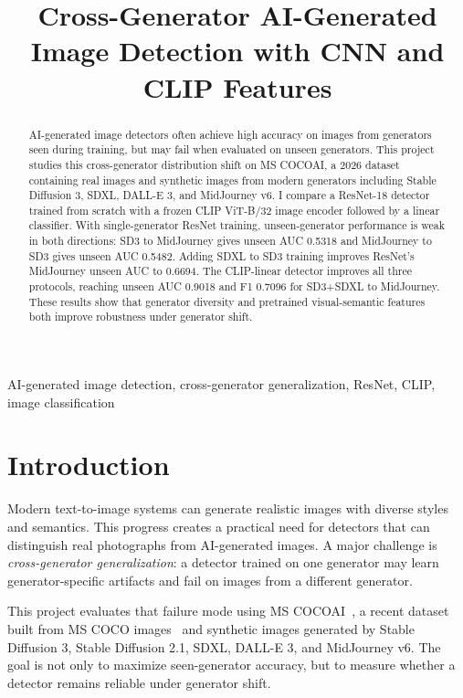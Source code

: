 \documentclass[conference]{IEEEtran}
\title{Cross-Generator AI-Generated Image Detection with CNN and CLIP Features}
\author{
\IEEEauthorblockN{Xufeiyang Shi}
\IEEEauthorblockA{
ECE4880J Computer Vision Final Project\\
Shanghai Jiao Tong University\\
Shanghai, China
}
}
\begin{document}
\maketitle

\begin{abstract}
AI-generated image detectors often achieve high accuracy on images from
generators seen during training, but may fail when evaluated on unseen
generators. This project studies this cross-generator distribution shift on
MS COCOAI, a 2026 dataset containing real images and synthetic images from
modern generators including Stable Diffusion 3, SDXL, DALL-E 3, and
MidJourney v6. I compare a ResNet-18 detector trained from scratch with a
frozen CLIP ViT-B/32 image encoder followed by a linear classifier. With
single-generator ResNet training, unseen-generator performance is weak in both
directions: SD3 to MidJourney gives unseen AUC 0.5318 and MidJourney to SD3
gives unseen AUC 0.5482. Adding SDXL to SD3 training improves ResNet's
MidJourney unseen AUC to 0.6694. The CLIP-linear detector improves all three
protocols, reaching unseen AUC 0.9018 and F1 0.7096 for SD3+SDXL to
MidJourney. These results show that generator diversity and pretrained
visual-semantic features both improve robustness under generator shift.
\end{abstract}

\begin{IEEEkeywords}
AI-generated image detection, cross-generator generalization, ResNet, CLIP,
image classification
\end{IEEEkeywords}

\section{Introduction}

Modern text-to-image systems can generate realistic images with diverse styles
and semantics. This progress creates a practical need for detectors that can
distinguish real photographs from AI-generated images. A major challenge is
\emph{cross-generator generalization}: a detector trained on one generator may
learn generator-specific artifacts and fail on images from a different
generator.

This project evaluates that failure mode using MS COCOAI~\cite{roy2026mscocoai},
a recent dataset built from MS COCO images~\cite{lin2014coco} and synthetic
images generated by Stable Diffusion 3, Stable Diffusion 2.1, SDXL, DALL-E 3,
and MidJourney v6. The goal is not only to maximize seen-generator accuracy,
but to measure whether a detector remains reliable under generator shift.
\end{document}
